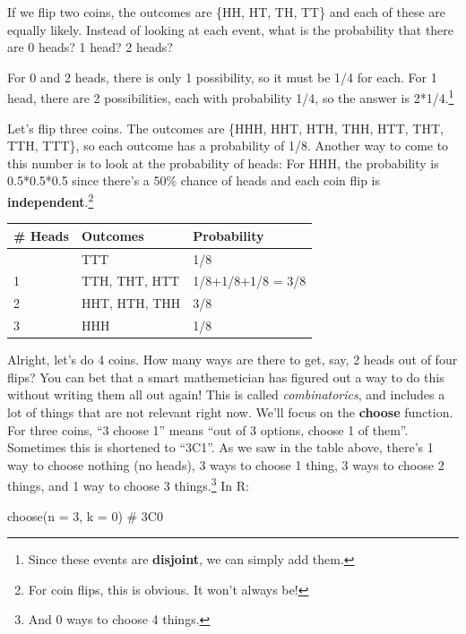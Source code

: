 \documentclass[
  letterpaper,
  DIV=11,
  numbers=noendperiod]{scrreprt}
\newenvironment{Shaded}{\begin{snugshade}}{\end{snugshade}}
\newcommand{\AttributeTok}[1]{\textcolor[rgb]{0.40,0.45,0.13}{#1}}
\newcommand{\CommentTok}[1]{\textcolor[rgb]{0.37,0.37,0.37}{#1}}
\newcommand{\DecValTok}[1]{\textcolor[rgb]{0.68,0.00,0.00}{#1}}
\newcommand{\FunctionTok}[1]{\textcolor[rgb]{0.28,0.35,0.67}{#1}}
\newcommand{\NormalTok}[1]{\textcolor[rgb]{0.00,0.23,0.31}{#1}}
\begin{document}
If we flip two coins, the outcomes are \{HH, HT, TH, TT\} and each of
these are equally likely. Instead of looking at each event, what is the
probability that there are 0 heads? 1 head? 2 heads?

For 0 and 2 heads, there is only 1 possibility, so it must be 1/4 for
each. For 1 head, there are 2 possibilities, each with probability 1/4,
so the answer is 2*1/4.\footnote{Since these events are
  \textbf{disjoint}, we can simply add them.}

Let's flip three coins. The outcomes are \{HHH, HHT, HTH, THH, HTT, THT,
TTH, TTT\}, so each outcome has a probability of 1/8. Another way to
come to this number is to look at the probability of heads: For HHH, the
probability is 0.5*0.5*0.5 since there's a 50\% chance of heads and each
coin flip is \textbf{independent}.\footnote{For coin flips, this is
  obvious. It won't always be!}

\begin{longtable}[]{@{}lll@{}}
\toprule\noalign{}
\# Heads & Outcomes & Probability \\
\midrule\noalign{}
\endhead
\bottomrule\noalign{}
\endlastfoot
0 & TTT & 1/8 \\
1 & TTH, THT, HTT & 1/8+1/8+1/8 = 3/8 \\
2 & HHT, HTH, THH & 3/8 \\
3 & HHH & 1/8 \\
\end{longtable}

Alright, let's do 4 coins. How many ways are there to get, say, 2 heads
out of four flips? You can bet that a smart mathemetician has figured
out a way to do this without writing them all out again! This is called
\emph{combinatorics}, and includes a lot of things that are not relevant
right now. We'll focus on the \textbf{choose} function. For three coins,
``3 choose 1'' means ``out of 3 options, choose 1 of them''. Sometimes
this is shortened to ``3C1''. As we saw in the table above, there's 1
way to choose nothing (no heads), 3 ways to choose 1 thing, 3 ways to
choose 2 things, and 1 way to choose 3 things.\footnote{And 0 ways to
  choose 4 things.} In R:

\begin{Shaded}
\begin{Highlighting}[]
\FunctionTok{choose}\NormalTok{(}\AttributeTok{n =} \DecValTok{3}\NormalTok{, }\AttributeTok{k =} \DecValTok{0}\NormalTok{) }\CommentTok{\# 3C0}
\end{Highlighting}
\end{Shaded}
\end{document}
